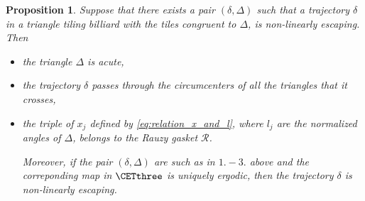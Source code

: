 \documentclass[12pt]{article}
\newtheorem{proposition}{Proposition}
\theoremstyle{definition}
\begin{document}
\begin{proposition}\label{thm:when_escape}
Suppose that there exists a pair $(\delta, \Delta)$ such that a trajectory $\delta$ in a triangle tiling billiard with the tiles congruent to $\Delta$, is non-linearly escaping. Then
\begin{itemize}
\item [1.] the triangle $\Delta$ is acute,
\item [2.] the trajectory $\delta$ passes through the circumcenters of all the triangles that it crosses,
\item[3.] the triple of $x_j$ defined by \eqref{eq:relation_x_and_l}, where $l_j$ are the normalized angles of $\Delta$, belongs to the Rauzy gasket $\mathcal{R}$.

Moreover, if the pair $(\delta, \Delta)$ are such as in $1.-3.$ above and the correponding map in $\CETthree$ is uniquely ergodic, then the trajectory $\delta$ is %
non-linearly escaping.
\end{itemize}
\end{proposition}
\end{document}
